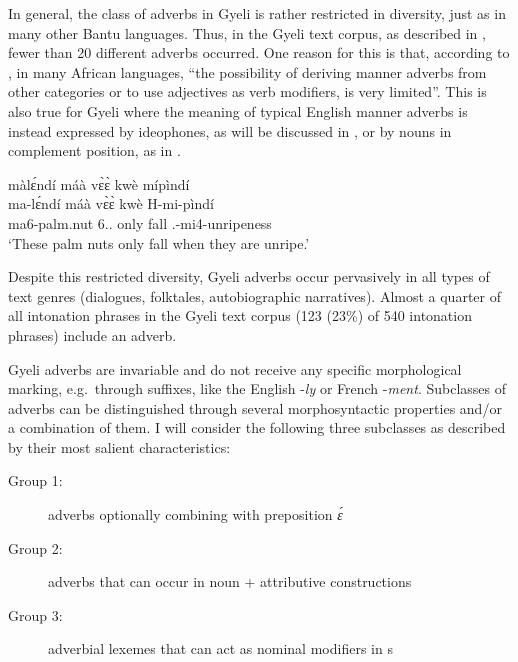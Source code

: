 In general, the class of adverbs in Gyeli is rather restricted in diversity, just as in many other Bantu languages. Thus, in the Gyeli text corpus, as described in ,
 fewer than 20 different adverbs occurred. One reason for this is that, according to  \citet[126]{creissels2008}, in many African languages, ``the possibility of deriving manner adverbs from other categories or to use adjectives as verb modifiers, is very limited''.  This is also true for Gyeli where the meaning of typical English manner adverbs is instead expressed by ideophones, as will be discussed in , or by nouns in complement position, as in .


\ea \label{maNCOMP}
  \glll     màlɛ́ndí máà vɛ̀ɛ̀ kwè mípìndí  \\
	ma-lɛ́ndí máà vɛ̀ɛ̀ kwè H-mi-pìndí \\
              ma6-palm.nut 6.{\DEM}.{\PROX} only fall {\OBJ}.{\LINK}-mi4-unripeness   \\
    \trans `These palm nuts only fall when they are unripe.'
\z

\noindent Despite this restricted diversity, Gyeli adverbs occur pervasively in all types of text genres (dialogues, folktales, autobiographic narratives). Almost a quarter of all intonation phrases in the Gyeli text corpus (123 (23\%) of 540 intonation phrases) include an adverb.

Gyeli adverbs are invariable and do not receive any specific morphological marking, e.g.\ through suffixes, like the English -{\itshape ly} or French -{\itshape ment}. Subclasses of adverbs can be distinguished through several morphosyntactic properties and/or a combination of them. I will consider the following three subclasses as described by their most salient characteristics:

\begin{description}
\item[Group 1:] adverbs optionally combining with {\LOC} preposition {\itshape ɛ́} 
\item[Group 2:] adverbs that can occur in noun + attributive constructions 
\item[Group 3:] adverbial lexemes that can act as nominal modifiers in {\NP}s 
\end{description}

